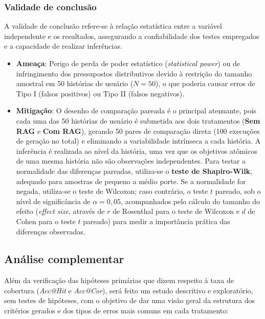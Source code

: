\subsubsection*{Validade de conclusão}

A validade de conclusão refere-se à relação estatística entre a variável independente e os resultados, assegurando a confiabilidade dos testes empregados e a capacidade de realizar inferências.

\begin{itemize}
    \item \textbf{Ameaça}: Perigo de perda de poder estatístico (\textit{statistical power}) ou de infringimento dos pressupostos distributivos devido à restrição do tamanho amostral em 50 histórias de usuário ($N = 50$), o que poderia causar erros de Tipo I (falsos positivos) ou Tipo II (falsos negativos).

    \item \textbf{Mitigação}: O desenho de comparação pareada é o principal atenuante, pois cada uma das 50 histórias de usuário é submetida aos dois tratamentos (\textbf{Sem RAG} e \textbf{Com RAG}), gerando 50 pares de comparação direta (100 execuções de geração no total) e eliminando a variabilidade intrínseca a cada história. A inferência é realizada ao nível da história, uma vez que os objetivos atômicos de uma mesma história não são observações independentes. Para testar a normalidade das diferenças pareadas, utiliza-se o \textbf{teste de Shapiro-Wilk}, adequado para amostras de pequeno a médio porte. Se a normalidade for negada, utiliza-se o teste de Wilcoxon; caso contrário, o teste $t$ pareado, sob o nível de significância de $\alpha = 0{,}05$, acompanhados pelo cálculo do tamanho do efeito (\textit{effect size}, através de $r$ de Rosenthal para o teste de Wilcoxon e $d$ de Cohen para o teste $t$ pareado) para medir a importância prática das diferenças observadas.
\end{itemize}

\subsection{Análise complementar}
\label{sec:analise-complementar}

Além da verificação das hipóteses primárias que dizem respeito à taxa de cobertura (\textit{Acc@Hit} e \textit{Acc@Cor}), será feito um estudo descritivo e exploratório, sem testes de hipóteses, com o objetivo de dar uma visão geral da estrutura dos critérios gerados e dos tipos de erros mais comuns em cada tratamento:

